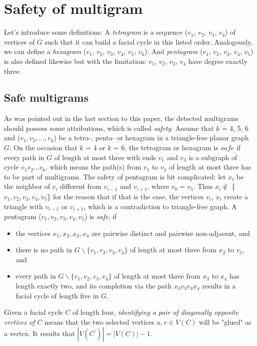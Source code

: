 \section{Safety of multigram}
Let's introduce some definitions: A \textit{tetragram} is a sequence ($v_1$, $v_2$, $v_3$, $v_4$) of vertices of $G$ such that it can build a facial cycle in this listed order. Analogously, we can define a \textit{hexagram} ($v_1$, $v_2$, $v_3$, $v_4$, $v_5$, $v_6$). And \textit{pentagram} ($v_1$, $v_2$, $v_3$, $v_4$, $v_5$) is also defined likewise but with the limitation: $v_1$, $v_2$, $v_3$, $v_4$ have degree exactly three.\\
\subsection{Safe multigrams}
As was pointed out in the last section to this paper, the detected multigrams should possess some attributions, which is called \textit{safety}. Assume that $k$ = 4, 5, 6 and ($v_1, v_2, ..., v_k$) be a tetra-, penta- or hexagram in a triangle-free planar graph $G$. On the occasion that $k$ = 4 or $k$ = 6, the tetragram or hexagram is $safe$ if every path in $G$ of length at most three with ends $v_1$ and $v_3$ is a subgraph of cycle $v_1v_2...v_k$, which means the path(s) from $v_1$ to $v_3$ of length at most three has to be part of multigrams. The safety of pentagram is bit complicated: let $x_i$ be the neighbor of $v_i$ different from $v_{i-1}$ and $v_{i+1}$, where $v_0 = v_5$. Thus $x_i \notin$ \{$v_1, v_2, v_3, v_4, v_5$\} for the reason that if that is the case, the vertices $v_i$, $x_i$ create a triangle with $v_{i-1}$ or $v_{i+1}$, which is a contradiction to triangle-free graph. A pentagram ($v_1, v_2, v_3, v_4, v_5$) is \textit{safe}, if
\begin{itemize}
    \item the vertices $x_1, x_2, x_3, x_4$ are pairwise distinct and pairwise non-adjacent, and
    \item there is no path in $G \backslash \{v_1, v_2, v_3, v_4\}$ of length at most three from $x_2$ to $v_5$, and
    \item every path in $G \backslash \{v_1, v_2, v_3, v_4\}$ of length at most three from $x_3$ to $x_4$ has length exactly two, and its completion via the path $x_3v_3v_4x_4$ results in a facial cycle of length five in $G$.
\end{itemize}
\cite{dvorak2013threecoloring}

\begin{definition}
Given a facial cycle $C$ of length four, \textit{identifying a pair of
diagonally opposite vertices of $C$} means that the two selected vertices $u, v \in V(C)$ will be "glued" as a vertex. It results that $|V(C^{'})| = |V(C)| - 1$.
\end{definition}

